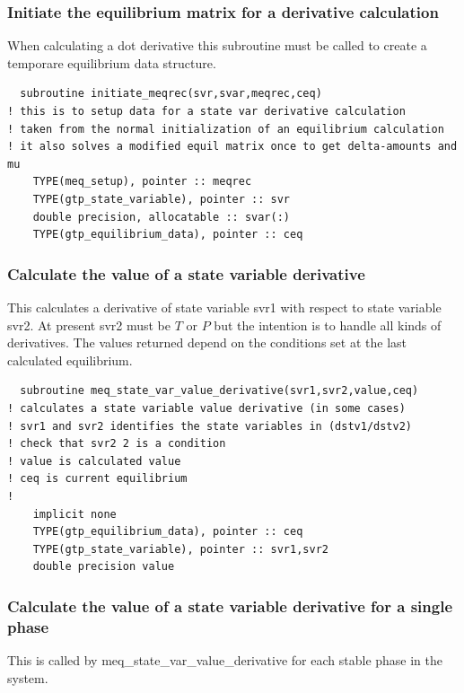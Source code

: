 \documentclass[12pt]{article}
\begin{document}
\subsubsection{Initiate the equilibrium matrix for a derivative calculation}

When calculating a dot derivative this subroutine must be called to
create a temporare equilibrium data structure.

{\small
\begin{verbatim}
  subroutine initiate_meqrec(svr,svar,meqrec,ceq)
! this is to setup data for a state var derivative calculation
! taken from the normal initialization of an equilibrium calculation
! it also solves a modified equil matrix once to get delta-amounts and mu
    TYPE(meq_setup), pointer :: meqrec
    TYPE(gtp_state_variable), pointer :: svr
    double precision, allocatable :: svar(:)
    TYPE(gtp_equilibrium_data), pointer :: ceq
\end{verbatim}
}

\subsubsection{Calculate the value of a state variable derivative}

This calculates a derivative of state variable svr1 with respect to
state variable svr2.  At present svr2 must be $T$ or $P$ but the
intention is to handle all kinds of derivatives.  The values returned
depend on the conditions set at the last calculated equilibrium.

{\small
\begin{verbatim}
  subroutine meq_state_var_value_derivative(svr1,svr2,value,ceq)
! calculates a state variable value derivative (in some cases)
! svr1 and svr2 identifies the state variables in (dstv1/dstv2)
! check that svr2 2 is a condition
! value is calculated value
! ceq is current equilibrium
!
    implicit none
    TYPE(gtp_equilibrium_data), pointer :: ceq
    TYPE(gtp_state_variable), pointer :: svr1,svr2
    double precision value
\end{verbatim}
}

\subsubsection{Calculate the value of a state variable derivative
for a single phase}

This is called by meq\_state\_var\_value\_derivative for each stable
phase in the system.
\end{document}
